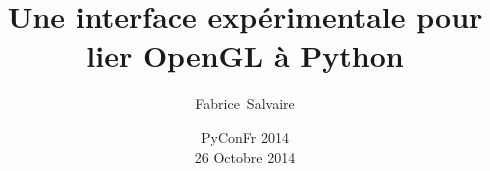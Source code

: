 





\title[]{Une interface expérimentale pour lier OpenGL à Python}
\author[F.~Salvaire]{Fabrice~Salvaire}
\date[26 oct 14]{PyConFr 2014 \\ {\tiny 26 Octobre 2014}}



\newcommand{\Cpp}{C\nolinebreak[4]\hspace{-.05em}\raisebox{.4ex}{\tiny\bf ++}}




%
%

\begin{frame} %
  \titlepage
\end{frame}

\logo{} %

%
%

\frame{\tableofcontents}

%
%

